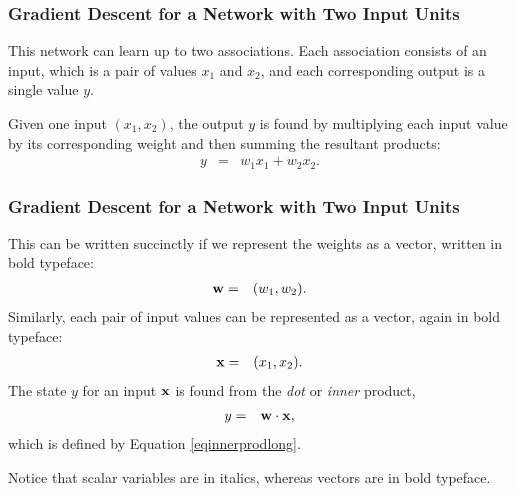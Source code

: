 \documentclass{beamer}
\newcommand{\bw}{       {\bf w      } }
\newcommand{\bx}{       {\bf x      } }
\newcommand{\bea}       { \begin{eqnarray}  }
\newcommand{\eea}       { \end{eqnarray}    }
\newcommand{\joutput}{state }
\begin{document}
\begin{frame}
  \frametitle{Gradient Descent for a Network with Two Input Units}
This network can learn up to two associations.  
 Each association consists of an input, which is a pair of values $x_{1}$ and $x_{2}$, and each corresponding output is a single value $y$. 

Given one input $(x_{1}, x_{2})$, the output $y$ is found by multiplying each input value by its corresponding weight and then summing the resultant products: 
\bea
	y & = & w_{1} x_{1} + w_{2} x_{2}. \label{eqinnerprodlong}
\eea
\end{frame}

\begin{frame}
  \frametitle{Gradient Descent for a Network with Two Input Units}
This can be written succinctly if we represent the weights as a vector, written in bold typeface:%
\bea
	\bw & = & (w_{1},w_{2}).
\eea
Similarly, each pair of input values can be represented as a vector, again in bold typeface:
\bea
	\bx & = & (x_{1},x_{2}).
\eea
The  \joutput $y$ for an input $\bx$ is found from the {\em dot} or {\em inner} product,
\bea
	y & = & \bw \cdot \bx,
\eea
which is defined by Equation \ref{eqinnerprodlong}. %

Notice that scalar variables are  in italics, whereas vectors are in bold typeface. 


\end{frame}
\end{document}
